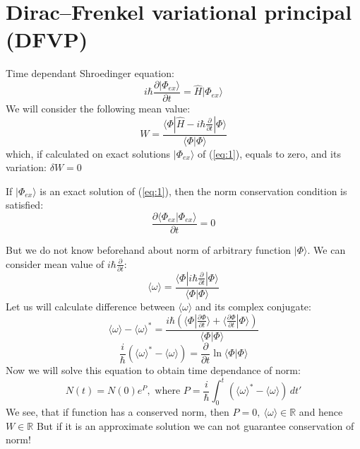 \documentclass[a4paper,14pt]{extarticle}
\begin{document}
\section{Dirac--Frenkel variational principal (DFVP)}
Time dependant Shroedinger equation:
\begin{equation}
i\hbar\frac{\partial |\Phi_{ex}\rangle}{\partial t} = \hat{H}|\Phi_{ex}\rangle
\label{eq:1}
\end{equation}
We will consider the following mean value:
$$W=\frac{ \langle \Phi| \hat{H} - i\hbar\frac{\partial}{\partial t} | \Phi \rangle }{\langle\Phi|\Phi\rangle}$$
which, if calculated on exact solutions $|\Phi_{ex}\rangle$ of (\ref{eq:1}), equals to zero, and its variation: $\delta W = 0$

If $|\Phi_{ex}\rangle$ is an exact solution of (\ref{eq:1}), then the norm conservation condition is satisfied:
$$\frac{\partial \langle\Phi_{ex}|\Phi_{ex}\rangle }{\partial t} = 0$$

But we do not know beforehand about norm of arbitrary function $|\Phi\rangle$.
We can consider mean value of $i\hbar\frac{\partial}{\partial t}$:
$$\langle\omega\rangle = \frac{ \langle \Phi | i\hbar\frac{\partial}{\partial t} | \Phi \rangle }{\langle\Phi|\Phi\rangle}$$
Let us will calculate difference between $\langle\omega\rangle$ and its complex conjugate:
$$\langle\omega\rangle-\langle\omega\rangle^* = \frac{i\hbar( \langle\Phi|\frac{\partial \Phi}{\partial t}\rangle + %
							      \langle\frac{\partial \Phi}{\partial t}|\Phi\rangle )}%
						     {\langle\Phi|\Phi\rangle}$$
$$\frac{i}{\hbar}\left(\langle\omega\rangle^*-\langle\omega\rangle\right) = \frac{\partial}{\partial t}\ln\langle\Phi|\Phi\rangle$$
Now we will solve this equation to obtain time dependance of norm:
$$N(t) = N(0)e^P,\text{ where } P = \frac{i}{\hbar}\int_0^t\left(\langle\omega\rangle^*-\langle\omega\rangle\right)\,dt'$$
We see, that if function has a conserved norm, then $P=0,\ \langle\omega\rangle\in\mathbb{R}$ and hence $W\in\mathbb{R}$
But if it is an approximate solution we can not guarantee conservation of norm!
\end{document}
